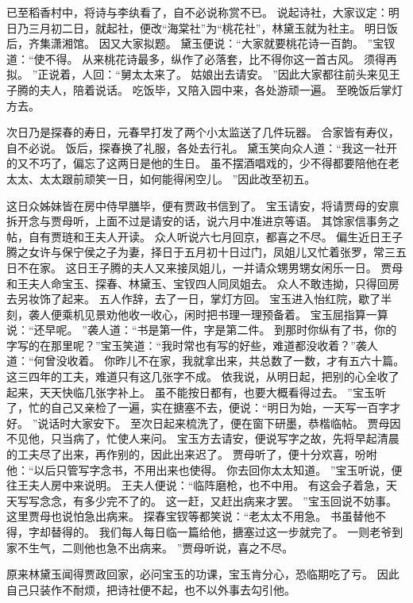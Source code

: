 已至稻香村中，将诗与李纨看了，自不必说称赏不已。
说起诗社，大家议定：明日乃三月初二日，就起社，便改“海棠社”为“桃花社”，林黛玉就为社主。
明日饭后，齐集潇湘馆。
因又大家拟题。
黛玉便说：“大家就要桃花诗一百韵。
”宝钗道：“使不得。
从来桃花诗最多，纵作了必落套，比不得你这一首古风。
须得再拟。
”正说着，人回：“舅太太来了。
姑娘出去请安。
”因此大家都往前头来见王子腾的夫人，陪着说话。
吃饭毕，又陪入园中来，各处游顽一遍。
至晚饭后掌灯方去。
\par
次日乃是探春的寿日，元春早打发了两个小太监送了几件玩器。
合家皆有寿仪，自不必说。
饭后，探春换了礼服，各处去行礼。
黛玉笑向众人道：“我这一社开的又不巧了，偏忘了这两日是他的生日。
虽不摆酒唱戏的，少不得都要陪他在老太太、太太跟前顽笑一日，如何能得闲空儿。
”因此改至初五。
\par
这日众姊妹皆在房中侍早膳毕，便有贾政书信到了。
宝玉请安，将请贾母的安禀拆开念与贾母听，上面不过是请安的话，说六月中准进京等语。
其馀家信事务之帖，自有贾琏和王夫人开读。
众人听说六七月回京，都喜之不尽。
偏生近日王子腾之女许与保宁侯之子为妻，择日于五月初十日过门，凤姐儿又忙着张罗，常三五日不在家。
这日王子腾的夫人又来接凤姐儿，一并请众甥男甥女闲乐一日。
贾母和王夫人命宝玉、探春、林黛玉、宝钗四人同凤姐去。
众人不敢违拗，只得回房去另妆饰了起来。
五人作辞，去了一日，掌灯方回。
宝玉进入怡红院，歇了半刻，袭人便乘机见景劝他收一收心，闲时把书理一理预备着。
宝玉屈指算一算说：“还早呢。
”袭人道：“书是第一件，字是第二件。
到那时你纵有了书，你的字写的在那里呢？”宝玉笑道：“我时常也有写的好些，难道都没收着？”袭人道：“何曾没收着。
你昨儿不在家，我就拿出来，共总数了一数，才有五六十篇。
这三四年的工夫，难道只有这几张字不成。
依我说，从明日起，把别的心全收了起来，天天快临几张字补上。
虽不能按日都有，也要大概看得过去。
”宝玉听了，忙的自己又亲检了一遍，实在搪塞不去，便说：“明日为始，一天写一百字才好。
”说话时大家安下。
至次日起来梳洗了，便在窗下研墨，恭楷临帖。
贾母因不见他，只当病了，忙使人来问。
宝玉方去请安，便说写字之故，先将早起清晨的工夫尽了出来，再作别的，因此出来迟了。
贾母听了，便十分欢喜，吩咐他：“以后只管写字念书，不用出来也使得。
你去回你太太知道。
”宝玉听说，便往王夫人房中来说明。
王夫人便说：“临阵磨枪，也不中用。
有这会子着急，天天写写念念，有多少完不了的。
这一赶，又赶出病来才罢。
”宝玉回说不妨事。
这里贾母也说怕急出病来。
探春宝钗等都笑说：“老太太不用急。
书虽替他不得，字却替得的。
我们每人每日临一篇给他，搪塞过这一步就完了。
一则老爷到家不生气，二则他也急不出病来。
”贾母听说，喜之不尽。
\par
原来林黛玉闻得贾政回家，必问宝玉的功课，宝玉肯分心，恐临期吃了亏。
因此自己只装作不耐烦，把诗社便不起，也不以外事去勾引他。
